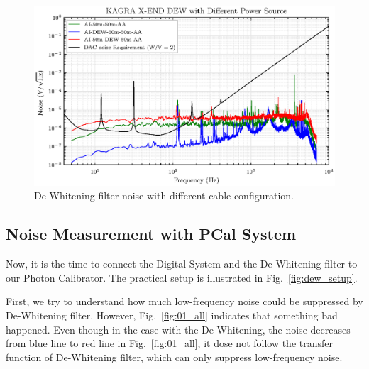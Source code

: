 \begin{figure}[hbt!]
\centering
\includegraphics[width=1\textwidth]{figure/noise/00_DSP}
\caption[De-Whitening filter noise with different cable configuration]{ De-Whitening filter noise with different cable configuration. }
\label{fig:00_DSP}
\end{figure}

\clearpage

\subsection{Noise Measurement with PCal System}
Now, it is the time to connect the Digital System and the De-Whitening filter to our Photon Calibrator. The practical setup is illustrated in Fig.~\ref{fig:dew_setup}.

First, we try to understand how much low-frequency noise could be suppressed by De-Whitening filter. However, Fig.~\ref{fig:01_all} indicates that something bad happened. Even though in the case with the De-Whitening, the noise decreases from blue line to red line in Fig.~\ref{fig:01_all}, it dose not follow the transfer function of De-Whitening filter, which can only suppress low-frequency noise.

